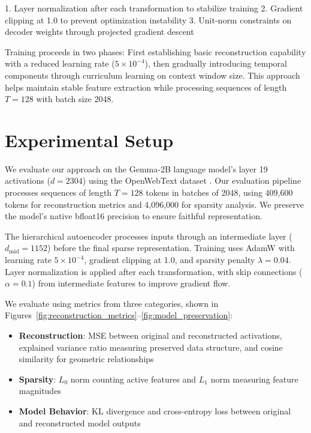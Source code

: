 \documentclass{article} %
\begin{document}
1. Layer normalization after each transformation to stabilize training
2. Gradient clipping at 1.0 to prevent optimization instability
3. Unit-norm constraints on decoder weights through projected gradient descent

Training proceeds in two phases: First establishing basic reconstruction capability with a reduced learning rate ($5 \times 10^{-4}$), then gradually introducing temporal components through curriculum learning on context window size. This approach helps maintain stable feature extraction while processing sequences of length $T=128$ with batch size 2048.

\section{Experimental Setup}
\label{sec:experimental}

We evaluate our approach on the Gemma-2B language model's layer 19 activations ($d=2304$) using the OpenWebText dataset \cite{Radford2019LanguageMA}. Our evaluation pipeline processes sequences of length $T=128$ tokens in batches of 2048, using 409,600 tokens for reconstruction metrics and 4,096,000 for sparsity analysis. We preserve the model's native bfloat16 precision to ensure faithful representation.

The hierarchical autoencoder processes inputs through an intermediate layer ($d_{\text{mid}}=1152$) before the final sparse representation. Training uses AdamW \cite{kingma2014adam} with learning rate $5 \times 10^{-4}$, gradient clipping at 1.0, and sparsity penalty $\lambda=0.04$. Layer normalization \cite{ba2016layer} is applied after each transformation, with skip connections ($\alpha=0.1$) from intermediate features to improve gradient flow.

We evaluate using metrics from three categories, shown in Figures~\ref{fig:reconstruction_metrics}--\ref{fig:model_preservation}:
\begin{itemize}
    \item \textbf{Reconstruction}: MSE between original and reconstructed activations, explained variance ratio measuring preserved data structure, and cosine similarity for geometric relationships
    \item \textbf{Sparsity}: $L_0$ norm counting active features and $L_1$ norm measuring feature magnitudes
    \item \textbf{Model Behavior}: KL divergence and cross-entropy loss between original and reconstructed model outputs
\end{itemize}
\end{document}
